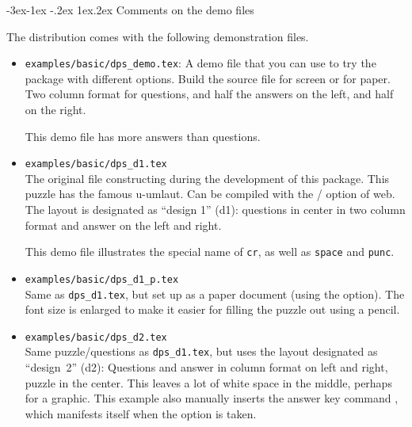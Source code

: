 \documentclass{article}
\makeatletter
\def\FmtMP#1{\marginpar{\slshape\raggedleft\small#1}}
\renewcommand{\section}{%
   \renewcommand{\@seccntformat}[1]{\csname the##1\endcsname.\enspace}%
   \@startsection{section}{1}{-62.5pt}%
   {-3ex\@plus -1ex \@minus-.2ex}%
   {1ex\@plus .2ex}%
   {\noindent\normalfont\large\bfseries\color{blue}}}%
\makeatother
\begin{document}
\section{Comments on the demo files}\label{distribution}

The distribution comes with the following demonstration files.

\begin{itemize}
    \item \texttt{examples/basic/dps\_demo.tex}\FmtMP{\texttt{basic} folder}: A demo file that you can use to
        try the package with different options. Build the source file for
        screen or for paper. Two column format for questions, and half the
        answers on the left, and half on the right.

        This demo file has more answers than questions.

    \item \texttt{examples/basic/dps\_d1.tex}\\ The original file constructing during
    the development of this package. This puzzle has the famous
    u-umlaut. Can be compiled with the
    /\allowbreak{} option of web. The layout
    is designated as ``design 1'' (d1): questions in center in two column format
    and answer on the left and right.

    This demo file illustrates the special name of \texttt{cr}, as well as \texttt{space} and \texttt{punc}.

    \item \texttt{examples/basic/dps\_d1\_p.tex}\\Same as \texttt{dps\_d1.tex}, but set up
        as a paper document (using the  option). The font size is
        enlarged to make it easier for filling the puzzle out using a
        pencil.

    \item \texttt{examples/basic/dps\_d2.tex}\\ Same puzzle/questions as
        \texttt{dps\_d1.tex}, but uses the layout designated as
        ``design~2'' (d2): Questions and answer in column format on left
        and right, puzzle in the center. This leaves a lot of white space
        in the middle, perhaps for a graphic. This example also manually
        inserts the answer key command , which manifests
        itself when the  option is taken.


\end{itemize}
\end{document}
